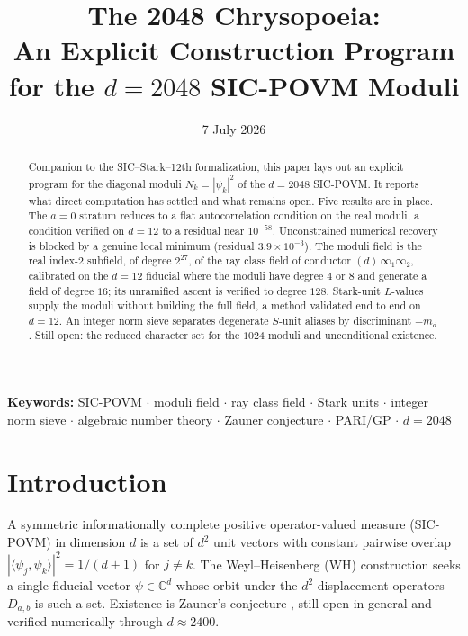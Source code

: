 \documentclass[12pt,a4paper]{article}
\newcommand{\md}{m_d}
\begin{document}
\title{\textbf{The 2048 Chrysopoeia:\\
An Explicit Construction Program for the $d=2048$ SIC-POVM Moduli}}


\date{7 July 2026}

\maketitle

\begin{abstract}
Companion to the SIC--Stark--12th formalization, this paper lays out an explicit program for the
diagonal moduli $N_k=|\psi_k|^2$ of the $d=2048$ SIC-POVM.  It reports what direct
computation has settled and what remains open.  Five results are in place.  The
$a=0$ stratum reduces to a flat autocorrelation condition on the real moduli, a
condition verified on $d=12$ to a residual near $10^{-58}$.  Unconstrained
numerical recovery is blocked by a genuine local minimum (residual
$3.9\times 10^{-3}$).  The moduli field is the real index-$2$ subfield, of
degree $2^{27}$, of the ray class field of conductor $(d)\,\infty_1\infty_2$,
calibrated on the $d=12$ fiducial where the moduli have degree $4$ or $8$ and
generate a field of degree $16$; its unramified ascent is verified to degree
$128$.  Stark-unit $L$-values
supply the moduli without building the full field, a method validated end to end
on $d=12$.  An integer norm sieve separates degenerate $S$-unit aliases by
discriminant $-\md$.  Still open: the reduced character set for the $1024$
moduli and unconditional existence.
\end{abstract}

\noindent\textbf{Keywords:} SIC-POVM \(\cdot\) moduli field \(\cdot\) ray class
field \(\cdot\) Stark units \(\cdot\) integer norm sieve \(\cdot\) algebraic
number theory \(\cdot\) Zauner conjecture \(\cdot\) PARI/GP \(\cdot\) $d=2048$

\newpage
\tableofcontents
\newpage

\section{Introduction}
\label{sec:intro}

A symmetric informationally complete positive operator-valued measure
(SIC-POVM) in dimension $d$ is a set of $d^2$ unit vectors with constant
pairwise overlap $|\langle \psi_j, \psi_k\rangle|^2 = 1/(d+1)$ for $j\neq k$.
The Weyl--Heisenberg (WH) construction seeks a single fiducial vector
$\psi\in\mathbb{C}^d$ whose orbit under the $d^2$ displacement operators
$D_{a,b}$ is such a set.  Existence is Zauner's conjecture \cite{Zauner1999},
still open in general and verified numerically through $d\approx 2400$.
\end{document}
